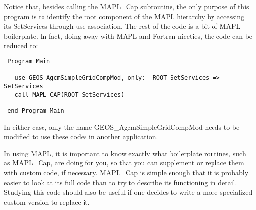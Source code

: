  Notice that, besides calling the MAPL\_Cap subroutine, the only purpose
 of this program is to identify the root component of the MAPL hierarchy
 by accessing its SetServices through use association. The rest of the code
 is a bit of MAPL boilerplate. In fact, doing away with MAPL and Fortran
 niceties, the code can be reduced to:
 
 \begin{verbatim}
 Program Main

   use GEOS_AgcmSimpleGridCompMod, only:  ROOT_SetServices => SetServices
   call MAPL_CAP(ROOT_SetServices)

 end Program Main
 \end{verbatim}
 
 In either case, only the name GEOS\_AgcmSimpleGridCompMod needs to be
 modified to use these codes in another application.
 
 In using MAPL, it is important to know exactly what boilerplate routines,
 such as MAPL\_Cap, are doing for you, so that you can supplement or replace
 them with custom code, if necessary. MAPL\_Cap is simple enough that it is
 probably easier to look at its full code than to try to describe its
 functioning in detail. Studying this code should also be useful if one
 decides to write a more specialized custom version to replace it. 
